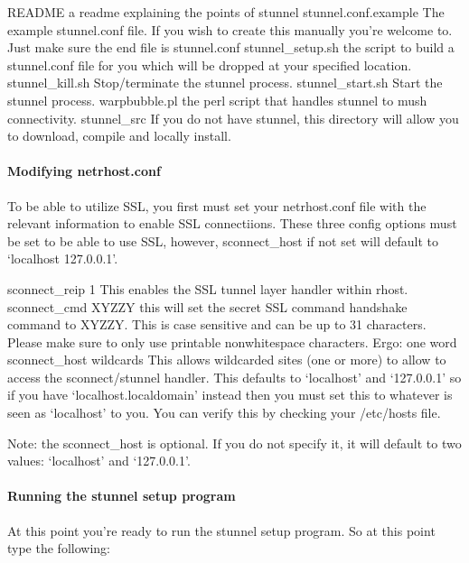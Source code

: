 \documentclass[letterpaper,10pt,english]{sphinxmanual}
\begin{document}
\sphinxAtStartPar
README                     \textendash{} a readme explaining the points of stunnel
stunnel.conf.example       \textendash{} The example stunnel.conf file.  If you wish to create this manually you’re welcome to.  Just make sure the end file is stunnel.conf
stunnel\_setup.sh           \textendash{} the script to build a stunnel.conf file for you which will be dropped at your specified location.
stunnel\_kill.sh            \textendash{} Stop/terminate the stunnel process.
stunnel\_start.sh           \textendash{} Start the stunnel process.
warpbubble.pl              \textendash{} the perl script that handles stunnel to mush connectivity.
stunnel\_src                \textendash{} If you do not have stunnel, this directory will allow you to download, compile and locally install.


\paragraph{Modifying netrhost.conf}
\label{\detokenize{security:modifying-netrhost-conf}}
\sphinxAtStartPar
To be able to utilize SSL, you first must set your netrhost.conf file with
the relevant information to enable SSL connectiions.  These three config
options must be set to be able to use SSL, however, sconnect\_host if
not set will default to ‘localhost 127.0.0.1’.

\sphinxAtStartPar
sconnect\_reip 1         \textendash{} This enables the SSL tunnel layer handler within rhost.
sconnect\_cmd XYZZY      \textendash{} this will set the secret SSL command handshake command to XYZZY.  This is case sensitive and can be up to 31 characters.  Please make sure to only use printable non\sphinxhyphen{}whitespace characters.  Ergo: one word
sconnect\_host wildcards \textendash{} This allows wildcarded sites (one or more) to allow to access the sconnect/stunnel handler.  This defaults to ‘localhost’ and ‘127.0.0.1’ so if you have ‘localhost.localdomain’ instead then you must set this to whatever is seen as ‘localhost’ to you.  You can verify this by checking your /etc/hosts file.

\sphinxAtStartPar
Note: the sconnect\_host is optional.  If you do not specify it, it will default to two values:  ‘localhost’ and ‘127.0.0.1’.


\paragraph{Running the stunnel setup program}
\label{\detokenize{security:running-the-stunnel-setup-program}}
\sphinxAtStartPar
At this point you’re ready to run the stunnel setup program.  So at this point type the following:
\end{document}

